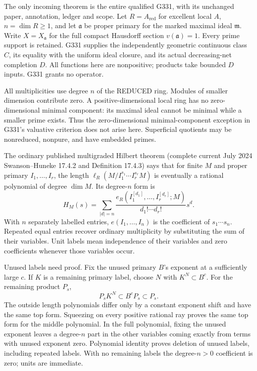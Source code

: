 The only incoming theorem is the entire qualified G331, with its unchanged paper, annotation, ledger and scope. Let \(R=A_{\mathrm{red}}\) for excellent local \(A\), \(n=\dim R\ge1\), and let \(\mathfrak a\) be proper primary for the marked maximal ideal \(\mathfrak m\). Write \(X=X_{\mathfrak a}\) for the full compact Hausdorff section \(v(\mathfrak a)=1\). Every prime support is retained. G331 supplies the independently geometric continuous class \(C\), its equality with the uniform ideal closure, and its actual decreasing-net completion \(D\). All functions here are nonpositive; products take bounded \(D\) inputs. G331 grants no operator.

All multiplicities use degree \(n\) of the REDUCED ring. Modules of smaller dimension contribute zero. A positive-dimensional local ring has no zero-dimensional minimal component: its maximal ideal cannot be minimal while a smaller prime exists. Thus the zero-dimensional minimal-component exception in G331's valuative criterion does not arise here. Superficial quotients may be nonreduced, nonpure, and have embedded primes.

The ordinary published multigraded Hilbert theorem (complete current July 2024 Swanson--Huneke 17.4.2 and Definition 17.4.3) says that for finite \(M\) and proper primary \(I_1,\ldots,I_r\), the length \(\ell_R(M/I_1^{s_1}\cdots I_r^{s_r}M)\) is eventually a rational polynomial of degree \(\dim M\). Its degree-\(n\) form is
\[
H_M(s)=\sum_{|d|=n}\frac{e_R(I_1^{[d_1]},\ldots,I_r^{[d_r]};M)}{d_1!\cdots d_r!}s^d.
\]
With \(n\) separately labelled entries, \(e(I_1,\ldots,I_n)\) is the coefficient of \(s_1\cdots s_n\). Repeated equal entries recover ordinary multiplicity by substituting the sum of their variables. Unit labels mean independence of their variables and zero coefficients whenever those variables occur.

Unused labels need proof. Fix the unused primary \(B\)'s exponent at a sufficiently large \(c\). If \(K\) is a remaining primary label, choose \(N\) with \(K^N\subset B^c\). For the remaining product \(P_s\),
\[
P_sK^N\subset B^cP_s\subset P_s.
\]
The outside length polynomials differ only by a constant exponent shift and have the same top form. Squeezing on every positive rational ray proves the same top form for the middle polynomial. In the full polynomial, fixing the unused exponent leaves a degree-\(n\) part in the other variables coming exactly from terms with unused exponent zero. Polynomial identity proves deletion of unused labels, including repeated labels. With no remaining labels the degree-\(n>0\) coefficient is zero; units are immediate.

